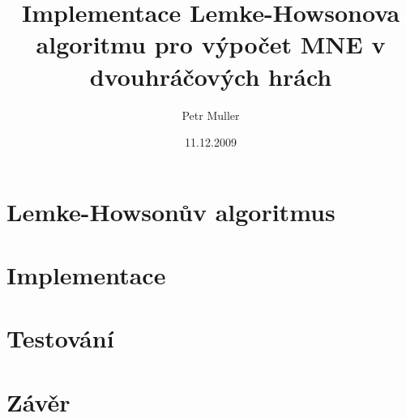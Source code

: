 \documentclass[a4paper, 12pt]{article}
\title{Implementace Lemke-Howsonova algoritmu pro výpočet MNE v dvouhráčových hrách}
\author{Petr Muller}
\date{11.12.2009}
\begin{document}
\maketitle
\section{Lemke-Howsonův algoritmus}
\section{Implementace}
\section{Testování}
\section{Závěr}
\end{document}
